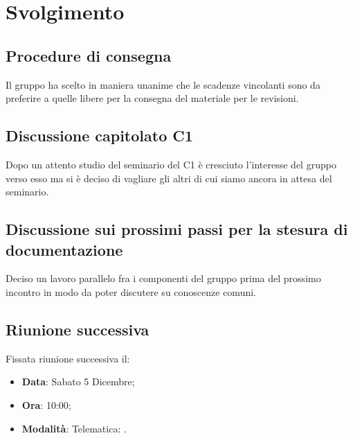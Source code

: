 \documentclass[]{article}
\begin{document}
	\newpage
	
	\section{Svolgimento}
		\subsection{Procedure di consegna}
		Il gruppo ha scelto in maniera unanime che le scadenze vincolanti sono da preferire a quelle libere per la consegna del materiale per le revisioni.\\
		
		\subsection{Discussione capitolato C1}
		Dopo un attento studio del seminario del  C1 è cresciuto l'interesse del gruppo verso esso ma si è deciso di vagliare gli altri  di cui siamo ancora in attesa del seminario. \\
		
		\subsection{Discussione sui prossimi passi per la stesura di documentazione}
		Deciso un lavoro parallelo fra i componenti del gruppo prima del
		prossimo incontro in modo da poter discutere su conoscenze comuni.\\
		
		\subsection{Riunione successiva}
		Fissata riunione successiva il:
		\begin{itemize}
			\item \textbf{Data}: Sabato 5 Dicembre;
			\item \textbf{Ora}: 10:00;
			\item \textbf{Modalità}: Telematica: .
		\end{itemize}	
	
\end{document}
